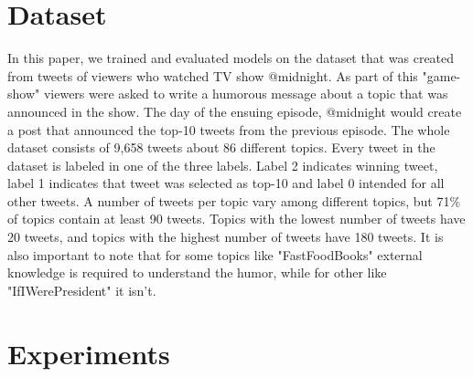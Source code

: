 \documentclass[10pt, a4paper]{article}
\begin{document}
\section{Dataset}
In this paper, we trained and evaluated models on the dataset that was created from tweets of viewers who watched TV show @midnight. As part of this "game-show" viewers were asked to write a humorous message about a topic that was announced in the show. The day of the ensuing episode, @midnight would create a post that announced the top-10 tweets from the previous episode. The whole dataset consists of 9,658 tweets about 86 different topics. Every tweet in the dataset is labeled in one of the three labels. Label 2 indicates winning tweet, label 1 indicates that tweet was selected as top-10 and label 0 intended for all other tweets. A number of tweets per topic vary among different topics, but 71\% of topics contain at least 90 tweets. Topics with the lowest number of tweets have 20 tweets, and topics with the highest number of tweets have 180 tweets. It is also important to note that for some topics like "FastFoodBooks" external knowledge is required to understand the humor, while for other like "IfIWerePresident" it isn't.

\section{Experiments}




\end{document}
